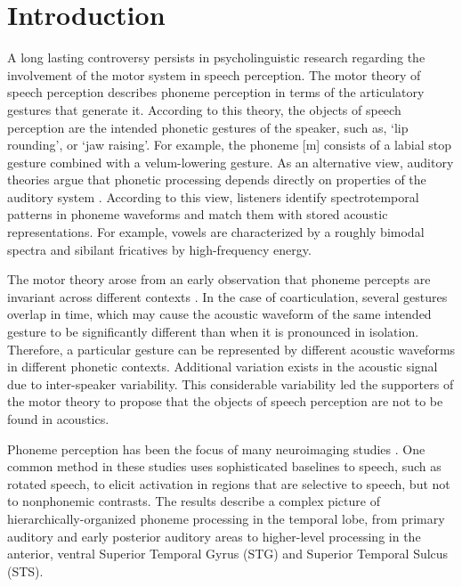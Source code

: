 \section{Introduction}
A long lasting controversy persists in psycholinguistic research regarding the involvement of the motor system in speech perception. The motor theory of speech perception \citep{liberman1967perception, liberman1985motor} describes phoneme perception in terms of the articulatory gestures that generate it. According to this theory, the objects of speech perception are the intended phonetic gestures of the speaker, such as, ‘lip rounding’, or ‘jaw raising’. For example, the phoneme [m] consists of a labial stop gesture combined with a velum-lowering gesture. As an alternative view, auditory theories argue that phonetic processing depends directly on properties of the auditory system \citep{jakobson1951preliminaries, stevens1972quantal, stevens1989quantal, stevens2002toward}. According to this view, listeners identify spectrotemporal patterns in phoneme waveforms and match them with stored acoustic representations. For example, vowels are characterized by a roughly bimodal spectra and sibilant fricatives by high-frequency energy.

The motor theory arose from an early observation that phoneme percepts are invariant across different contexts \citep{cooper1952some, liberman1967perception}. In the case of coarticulation, several gestures overlap in time, which may cause the acoustic waveform of the same intended gesture to be significantly different than when it is pronounced in isolation. Therefore, a particular gesture can be represented by different acoustic waveforms in different phonetic contexts. Additional variation exists in the acoustic signal due to inter-speaker variability.  This considerable variability led the supporters of the motor theory to propose that the objects of speech perception are not to be found in acoustics.

Phoneme perception has been the focus of many neuroimaging studies \citep{liebenthal2005neural, dehaene2005neural, mottonen2006perceiving, desai2008left, liebenthal2010specialization,  formisano2008saying, binder2000human, Dewitt2012}. One common method in these studies uses sophisticated baselines to speech, such as rotated speech, to elicit activation in regions that are selective to speech, but not to nonphonemic contrasts. The results describe a complex picture of hierarchically-organized phoneme processing in the temporal lobe, from primary auditory and early posterior auditory areas to higher-level processing in the anterior, ventral Superior Temporal Gyrus (STG) and Superior Temporal Sulcus (STS). 

